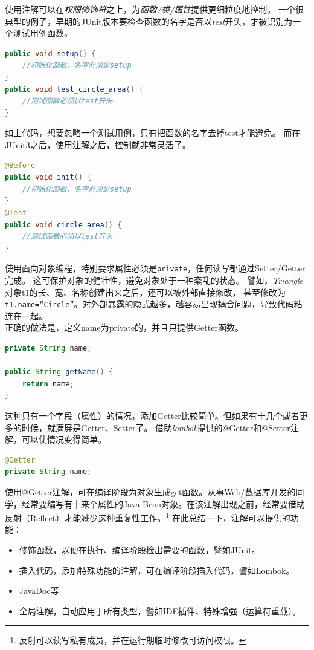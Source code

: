 使用注解可以在\emph{权限修饰符}之上，为\emph{函数/类/属性}提供更细粒度地控制。
一个很典型的例子，早期的JUnit版本要检查函数的名字是否以\emph{test}开头，才被识别为一个测试用例函数。

\begin{lstlisting}[language=Java,mathescape]
public void setup() {
    //初始化函数，名字必须是setup
}
public void test_circle_area() {
    //测试函数必须以test开头
}
\end{lstlisting}

\noindent
如上代码，想要忽略一个测试用例，只有把函数的名字去掉test才能避免。
而在JUnit3之后，使用注解之后，控制就非常灵活了。

\begin{lstlisting}[language=Java,mathescape]
@Before
public void init() {
    //初始化函数，名字必须是setup
}
@Test
public void circle_area() {
    //测试函数必须以test开头
}
\end{lstlisting}

\noindent
使用面向对象编程，特别要求属性必须是\lstinline{private}，任何读写都通过Setter/Getter完成。
这可保护对象的健壮性，避免对象处于一种紊乱的状态。
譬如，\emph{Triangle}对象t1的长、宽、名称创建出来之后，还可以被外部直接修改，
甚至修改为\lstinline{t1.name=“Circle”}。对外部暴露的隐式越多，越容易出现耦合问题，导致代码粘连在一起。
\ \\
\noindent
正确的做法是，定义name为private的，并且只提供Getter函数。
\begin{lstlisting}[language=Java,mathescape]
private String name;

public String getName() {
    return name;
}
\end{lstlisting}
\noindent
这种只有一个字段（属性）的情况，添加Getter比较简单。但如果有十几个或者更多的时候，就满屏是Getter、Setter了。
借助\emph{lombok}提供的@Getter和@Setter注解，可以使情况变得简单。
\begin{lstlisting}[language=Java,mathescape]
@Getter
private String name;
\end{lstlisting}
\noindent
使用@Getter注解，可在编译阶段为对象生成get函数。从事Web/数据库开发的同学，经常要编写有十来个属性的Java Bean对象。在该注解出现之前，经常要借助反射（Reflect）才能减少这种重复性工作。\footnote{反射可以读写私有成员，并在运行期临时修改可访问权限。} 
在此总结一下，注解可以提供的功能：
\begin{itemize}
\item [1.] 修饰函数，以便在执行、编译阶段检出需要的函数，譬如JUnit。
\item [2.] 插入代码，添加特殊功能的注解，可在编译阶段插入代码，譬如Lombok。
\item [3.] JavaDoc等
\item [4.] 全局注解，自动应用于所有类型，譬如IDE插件、特殊增强（运算符重载）。
\end{itemize}

